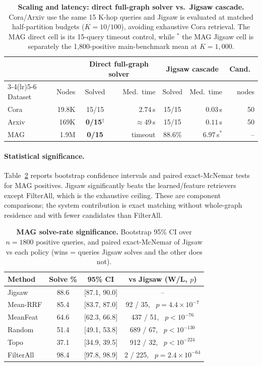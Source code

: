\documentclass[runningheads]{llncs}
\begin{document}
\begin{table}[H]
\centering
\caption{\textbf{Scaling and latency: direct full-graph solver vs.\ Jigsaw cascade.} Cora/Arxiv use the same 15 K-hop queries and Jigsaw is evaluated at matched half-partition budgets ($K=10/100$), avoiding exhaustive Cora retrieval. The MAG direct cell is its 15-query timeout control, while $^\ast$ the MAG Jigsaw cell is separately the 1,800-positive main-benchmark mean at $K=1{,}000$.}
\label{tab:scaling_latency}
\small
\begin{tabular}{l r c r c r r}
\toprule
 & & \multicolumn{2}{c}{Direct full-graph solver} & \multicolumn{2}{c}{Jigsaw cascade} & Cand.\ \\
\cmidrule(lr){3-4}\cmidrule(lr){5-6}
Dataset & Nodes & Solved & Med.\ time & Solved & Med.\ time & nodes \\
\midrule
Cora  & 19.8K & 15/15 & $2.74$\,s & 15/15 & $\mathbf{0.03}$\,s & 50 \\
Arxiv & 169K  & \textbf{0/15}$^\dagger$ & ${\approx}49$\,s & 15/15 & $\mathbf{0.11}$\,s & 50 \\
MAG   & 1.9M  & \textbf{0/15} & timeout & 88.6\% & $6.97$\,s$^\ast$ & -- \\
\bottomrule
\end{tabular}
\end{table}

\paragraph{Statistical significance.}
Table~\ref{tab:significance} reports bootstrap confidence intervals and paired exact-McNemar tests for MAG positives. Jigsaw significantly beats the learned/feature retrievers except FilterAll, which is the exhaustive ceiling. These are component comparisons; the system contribution is exact matching without whole-graph residence and with fewer candidates than FilterAll.

\begin{table}[H]
\centering
\caption{\textbf{MAG solve-rate significance.} Bootstrap 95\% CI over $n{=}1800$ positive queries, and paired exact-McNemar of Jigsaw vs each policy (wins = queries Jigsaw solves and the other does not).}
\label{tab:significance}
\small
\setlength{\tabcolsep}{6pt}
\begin{tabular}{lccc}
\toprule
\textbf{Method} & \textbf{Solve \%} & \textbf{95\% CI} & \textbf{vs Jigsaw (W/L, $p$)} \\
\midrule
Jigsaw    & 88.6 & [87.1, 90.0] & -- \\
Mean-RRF  & 85.4 & [83.7, 87.0] & 92 / 35, \ $p{=}4.4{\times}10^{-7}$ \\
MeanFeat  & 64.6 & [62.3, 66.8] & 437 / 51, \ $p{<}10^{-76}$ \\
Random    & 51.4 & [49.1, 53.8] & 689 / 67, \ $p{<}10^{-130}$ \\
Topo      & 37.1 & [34.9, 39.5] & 912 / 32, \ $p{<}10^{-224}$ \\
FilterAll & 98.4 & [97.8, 98.9] & 2 / 225, \ $p{=}2.4{\times}10^{-64}$ \\
\bottomrule
\end{tabular}
\end{table}
\end{document}

